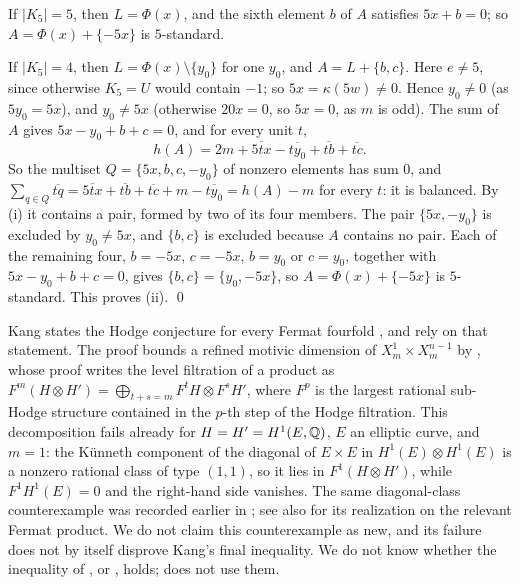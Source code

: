 If $|K_{5}|=5$, then $L=\Phi(x)$, and the sixth element $b$ of $A$ satisfies
$5x+b=0$; so $A=\Phi(x)+\{-5x\}$ is $5$-standard.

If $|K_{5}|=4$, then $L=\Phi(x)\setminus\{y_{0}\}$ for one $y_{0}$, and
$A=L+\{b,c\}$. Here $e\ne5$, since otherwise $K_{5}=U$ would contain $-1$;
so $5x=\kappa(5w)\ne0$. Hence $y_{0}\ne0$ (as $5y_{0}=5x$), and $y_{0}\ne5x$
(otherwise $20x=0$, so $5x=0$, as $m$ is odd). The sum of $A$ gives
$5x-y_{0}+b+c=0$, and for every unit $t$,
\[
  h(A)=2m+\overline{5tx}-\overline{ty_{0}}+\overline{tb}+\overline{tc}.
\]
So the multiset $Q=\{5x,b,c,-y_{0}\}$ of nonzero elements has sum $0$, and
$\sum_{q\in Q}\overline{tq}=\overline{5tx}+\overline{tb}+\overline{tc}+m-
\overline{ty_{0}}=h(A)-m$ for every $t$: it is balanced. By (i) it contains a
pair, formed by two of its four members. The pair $\{5x,-y_{0}\}$ is
excluded by $y_{0}\ne5x$, and $\{b,c\}$ is excluded because $A$ contains no
pair. Each of the remaining four, $b=-5x$, $c=-5x$, $b=y_{0}$ or $c=y_{0}$,
together with $5x-y_{0}+b+c=0$, gives $\{b,c\}=\{y_{0},-5x\}$, so
$A=\Phi(x)+\{-5x\}$ is $5$-standard. This proves (ii).
\qed

\begin{remark}\label{rem:kang}
Kang states the Hodge conjecture for every Fermat fourfold
\cite[Corollary~3.2]{Kan16}, and \cite{MMRV26} rely on that statement. The
proof bounds a refined motivic dimension of $X^{1}_{m}\times X^{n-1}_{m}$ by
\cite[Proposition~2.2(iv)]{Kan15}, whose proof writes the level filtration of
a product as $F^{m}(H\otimes H')=\bigoplus_{t+s=m}F^{t}H\otimes F^{s}H'$,
where $F^{p}$ is the largest rational sub-Hodge structure contained in the
$p$-th step of the Hodge filtration. This decomposition fails already for
$H=H'=H^{1}(E,\mathbb{Q})$, $E$ an elliptic curve, and $m=1$: the K\"unneth
component of the diagonal of $E\times E$ in $H^{1}(E)\otimes H^{1}(E)$ is a
nonzero rational class of type $(1,1)$, so it lies in $F^{1}(H\otimes H')$,
while $F^{1}H^{1}(E)=0$ and the right-hand side vanishes.
The same diagonal-class counterexample was recorded earlier in
\cite[\S1.1]{Li26a}; see also \cite[\S6]{Li26b} for its realization
on the relevant Fermat product. We do not claim this counterexample as
new, and its failure does not by itself disprove Kang's final inequality.
We do not know
whether the inequality of \cite[Proposition~2.2(iv)]{Kan15}, or
\cite[Corollary~3.2]{Kan16}, holds;  does not use them.
\end{remark}
